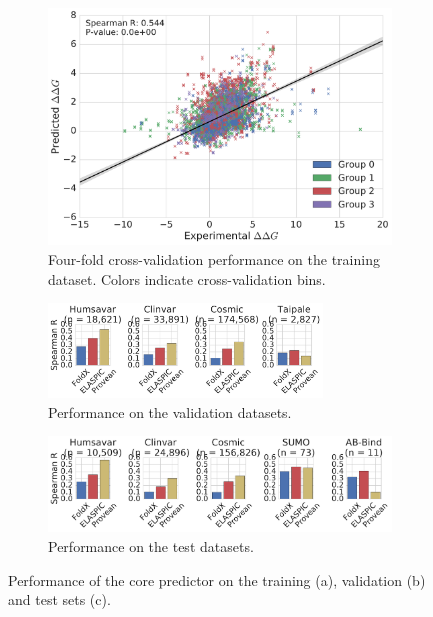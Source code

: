 \begin{figure}[tb]
	\centering
	\begin{subfigure}[b]{1.0\textwidth}
		\centering
		\includegraphics[width=0.6\linewidth]{static/elaspic_training_set/validation/crossvalidation_performance_core.pdf}
		\caption{Four-fold cross-validation performance on the training dataset. Colors indicate cross-validation bins.}
		\vspace*{10mm}
	\end{subfigure}
	\begin{subfigure}[b]{1.0\textwidth}
		\centering
		\includegraphics[width=0.8\textwidth]{static/elaspic_training_set/validation/validation_performance_core.pdf}
		\caption{Performance on the validation datasets.}
		\vspace*{10mm}
	\end{subfigure}
	\begin{subfigure}[b]{1.0\textwidth}
		\centering
		\includegraphics[width=1.0\textwidth]{static/elaspic_training_set/validation/test_performance_core.pdf}
		\caption{Performance on the test datasets.}
	\end{subfigure}
	\caption[Core predictor validation.]{Performance of the core predictor on the training (a), validation (b) and test sets (c).}
\end{figure}

